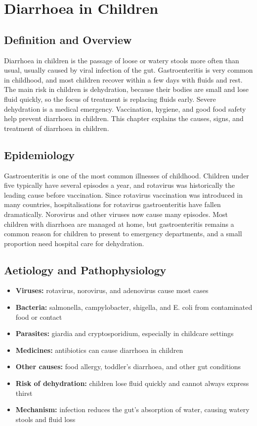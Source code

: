 \chapter{Diarrhoea in Children}

\section*{Definition and Overview}
Diarrhoea in children is the passage of loose or watery stools more often than usual, usually caused by viral infection of the gut. Gastroenteritis is very common in childhood, and most children recover within a few days with fluids and rest. The main risk in children is dehydration, because their bodies are small and lose fluid quickly, so the focus of treatment is replacing fluids early. Severe dehydration is a medical emergency. Vaccination, hygiene, and good food safety help prevent diarrhoea in children. This chapter explains the causes, signs, and treatment of diarrhoea in children.

\section*{Epidemiology}
Gastroenteritis is one of the most common illnesses of childhood. Children under five typically have several episodes a year, and rotavirus was historically the leading cause before vaccination. Since rotavirus vaccination was introduced in many countries, hospitalisations for rotavirus gastroenteritis have fallen dramatically. Norovirus and other viruses now cause many episodes. Most children with diarrhoea are managed at home, but gastroenteritis remains a common reason for children to present to emergency departments, and a small proportion need hospital care for dehydration.

\section*{Aetiology and Pathophysiology}
\begin{itemize}
    \item \textbf{Viruses:} rotavirus, norovirus, and adenovirus cause most cases
    \item \textbf{Bacteria:} salmonella, campylobacter, shigella, and E. coli from contaminated food or contact
    \item \textbf{Parasites:} giardia and cryptosporidium, especially in childcare settings
    \item \textbf{Medicines:} antibiotics can cause diarrhoea in children
    \item \textbf{Other causes:} food allergy, toddler's diarrhoea, and other gut conditions
    \item \textbf{Risk of dehydration:} children lose fluid quickly and cannot always express thirst
    \item \textbf{Mechanism:} infection reduces the gut's absorption of water, causing watery stools and fluid loss
\end{itemize}


